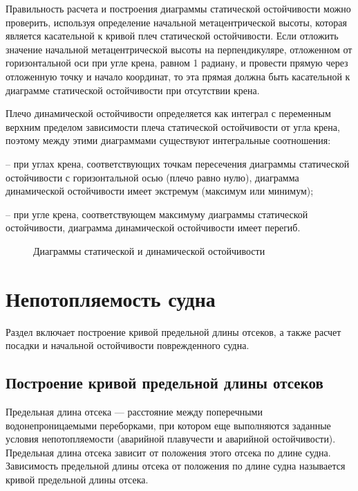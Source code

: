Правильность расчета и построения диаграммы статической остойчивости можно проверить, используя определение начальной метацентрической высоты, которая является касательной к кривой плеч статической остойчивости.
Если отложить значение начальной метацентрической высоты на перпендикуляре, отложенном от горизонтальной оси при угле крена, равном 1 радиану, и провести прямую через отложенную точку и начало координат, то эта прямая должна быть касательной к диаграмме статической остойчивости при отсутствии крена.

Плечо динамической остойчивости определяется как интеграл с переменным верхним пределом зависимости плеча статической остойчивости от угла крена, поэтому между этими диаграммами существуют интегральные соотношения:

-- при углах крена, соответствующих точкам пересечения диаграммы статической остойчивости с горизонтальной осью (плечо равно нулю), диаграмма динамической остойчивости имеет экстремум (максимум или минимум);

-- при угле крена, соответствующем максимуму диаграммы статической остойчивости, диаграмма динамической остойчивости имеет перегиб.

\begin{figure}[h!]
    \centerline{}
    \caption{Диаграммы статической и динамической остойчивости}
    \label{fig:stability-curves}
\end{figure}

\section{Непотопляемость судна}

Раздел включает построение кривой предельной длины отсеков, а также расчет посадки и начальной остойчивости поврежденного судна.

\subsection{Построение кривой предельной длины отсеков}

Предельная длина отсека --- расстояние между поперечными водонепроницаемыми переборками, при котором еще выполняются заданные условия непотопляемости (аварийной плавучести и аварийной остойчивости).
Предельная длина отсека зависит от положения этого отсека по длине судна.
Зависимость предельной длины отсека от положения по длине судна называется кривой предельной длины отсека.

